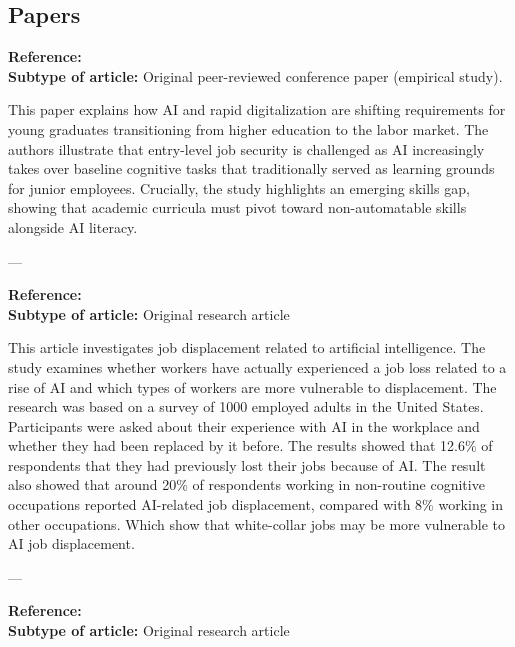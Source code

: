 \documentclass[letterpaper,11pt]{article}
\begin{document}
\subsection*{Papers}

\textbf{Reference:} \cite{employment2024rizun} \\
\textbf{Subtype of article:} Original peer-reviewed conference paper (empirical study).

This paper explains how AI and rapid digitalization are shifting requirements
for young graduates transitioning from higher education to the labor market.
The authors illustrate that entry-level job security is challenged as AI
increasingly takes over baseline cognitive tasks that traditionally served
as learning grounds for junior employees. Crucially, the study highlights
an emerging skills gap, showing that academic curricula must pivot toward
non-automatable skills alongside AI literacy.

---

\textbf{Reference:} \cite{stealingjobs2024eric} \\
\textbf{Subtype of article:} Original research article

This article investigates job displacement related to artificial intelligence.
The study examines whether workers have actually experienced a job loss related to a rise of AI
and which types of workers are more vulnerable to displacement. The research was based
on a survey of 1000 employed adults in the United States. Participants were asked
about their experience with AI in the workplace and whether they had been replaced by it
before. The results showed that 12.6\% of respondents that they had previously lost their
jobs because of AI. The result also showed that around 20\% of respondents working in
non-routine cognitive occupations reported AI-related job displacement,
compared with 8\% working in other occupations. Which show that white-collar jobs
may be more vulnerable to AI job displacement.

---

\textbf{Reference:} \cite{abraham_solaja_artificial_2025} \\
\textbf{Subtype of article:} Original research article
\end{document}
